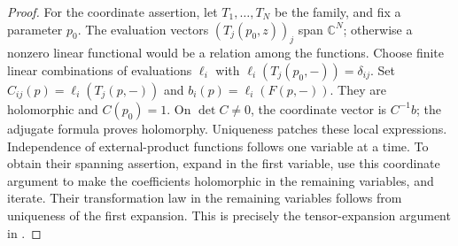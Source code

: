 \begin{proof}
For the coordinate assertion, let \(T_1,\ldots,T_N\) be the family,
and fix a parameter \(p_0\).
The evaluation vectors \((T_j(p_0,z))_j\) span \(\mathbb C^N\);
otherwise a nonzero linear functional would be a relation among
the functions.  Choose finite linear combinations of evaluations
\(\ell_i\) with \(\ell_i(T_j(p_0,-))=\delta_{ij}\).
Set \(C_{ij}(p)=\ell_i(T_j(p,-))\) and
\(b_i(p)=\ell_i(F(p,-))\).  They are holomorphic and \(C(p_0)=1\).
On \(\det C\ne0\), the coordinate vector is \(C^{-1}b\);
the adjugate formula proves holomorphy.  Uniqueness patches these
local expressions.  Independence of external-product functions
follows one variable at a time.  To obtain their spanning
assertion, expand in the first variable, use this coordinate
argument to make the coefficients holomorphic in the remaining
variables, and iterate.  Their transformation law in the
remaining variables follows from uniqueness of the first
expansion.  This is precisely the tensor-expansion argument in
.
\end{proof}

